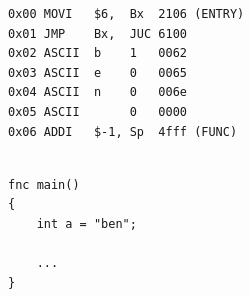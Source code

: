 \documentclass[11pt,a4paper]{report}
\begin{document}
\begin{figure}[!h]
    \begin{minipage}{0.5\textwidth}
        \centering
\begin{verbatim}
0x00 MOVI   $6,  Bx  2106 (ENTRY)
0x01 JMP    Bx,  JUC 6100 
0x02 ASCII  b    1   0062 
0x03 ASCII  e    0   0065 
0x04 ASCII  n    0   006e 
0x05 ASCII       0   0000 
0x06 ADDI   $-1, Sp  4fff (FUNC)
\end{verbatim}
        \label{fig:compiler_cg_vars_asm}
    \end{minipage}
    \begin{minipage}{0.05\textwidth}\hfill\end{minipage}
    \begin{minipage}{0.5\textwidth}
        \centering
\begin{verbatim}

fnc main() 
{
    int a = "ben";
    
    ...
}
\end{verbatim}
        \label{fig:compiler_cg_vars_high}
    \end{minipage}
    \label{fig:compiler_cg_vars}
\end{figure}
\end{document}
